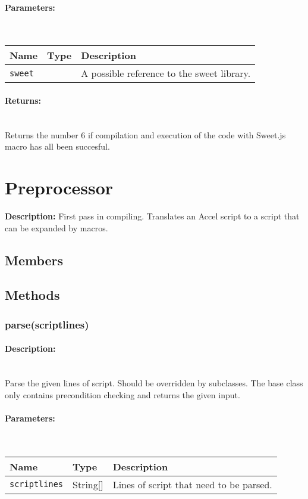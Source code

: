 \paragraph{Parameters:} \hfill \\ 
\begin{tabular}{|l|l|l|}
\hline
\textbf{Name} & \textbf{Type} & \textbf{Description} \\ 
\hline
\texttt{sweet} &  & A possible reference to the sweet library.\\ 
\hline
\end{tabular}
\paragraph{Returns:} \hfill \\ 
Returns the number 6 if compilation and execution of the code with Sweet.js macro has all been succesful.\\ 
\section{Preprocessor} 
\textbf{Description: }First pass in compiling. Translates an Accel script to a script that can be expanded by macros.
\subsection{Members} 
\subsection{Methods} 
\subsubsection{parse(scriptlines)} 
\paragraph{Description:} \hfill \\ 
Parse the given lines of script.
Should be overridden by subclasses.
The base class only contains precondition checking and returns the given input.
\paragraph{Parameters:} \hfill \\ 
\begin{tabular}{|l|l|l|}
\hline
\textbf{Name} & \textbf{Type} & \textbf{Description} \\ 
\hline
\texttt{scriptlines} & String[] & Lines of script that need to be parsed.\\ 
\hline
\end{tabular}
